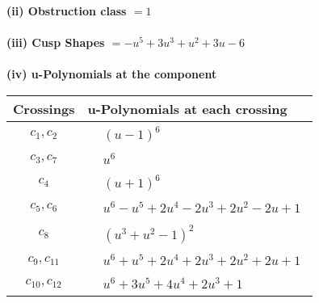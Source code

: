 \documentclass[1p]{elsarticle_modified}
\theoremstyle{definition}
\begin{document}
\flushleft \textbf{(ii) Obstruction class $= 1$}\\~\\
\flushleft \textbf{(iii) Cusp Shapes $= - u^5+3 u^3+u^2+3 u-6$}\\~\\
\newpage\renewcommand{\arraystretch}{1}
\flushleft \textbf{(iv) u-Polynomials at the component}\newline \\
\begin{tabular}{m{50pt}|m{274pt}}
Crossings & \hspace{64pt}u-Polynomials at each crossing \\
\hline $$\begin{aligned}c_{1},c_{2}\end{aligned}$$&$\begin{aligned}
&(u-1)^6
\end{aligned}$\\
\hline $$\begin{aligned}c_{3},c_{7}\end{aligned}$$&$\begin{aligned}
&u^6
\end{aligned}$\\
\hline $$\begin{aligned}c_{4}\end{aligned}$$&$\begin{aligned}
&(u+1)^6
\end{aligned}$\\
\hline $$\begin{aligned}c_{5},c_{6}\end{aligned}$$&$\begin{aligned}
&u^6- u^5+2 u^4-2 u^3+2 u^2-2 u+1
\end{aligned}$\\
\hline $$\begin{aligned}c_{8}\end{aligned}$$&$\begin{aligned}
&(u^3+u^2-1)^2
\end{aligned}$\\
\hline $$\begin{aligned}c_{9},c_{11}\end{aligned}$$&$\begin{aligned}
&u^6+u^5+2 u^4+2 u^3+2 u^2+2 u+1
\end{aligned}$\\
\hline $$\begin{aligned}c_{10},c_{12}\end{aligned}$$&$\begin{aligned}
&u^6+3 u^5+4 u^4+2 u^3+1
\end{aligned}$\\
\hline
\end{tabular}\\~\\
\end{document}
